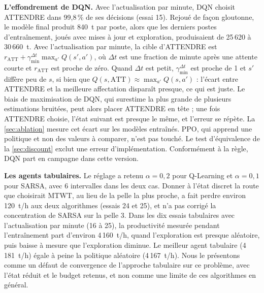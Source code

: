\documentclass[11pt,a4paper]{article}
\newif\ifrevmarks
\newcommand{\revtag}[1]{\ifrevmarks\textsuperscript{\textcolor{red!70!black}{\scriptsize[#1]}}\fi}
\newenvironment{revbloc}[1]{\par\ifrevmarks\color{revcolor}\noindent\revtag{#1}\ \fi}{\par}
\newif\ifcorrmarks
\newcommand{\corr}[1]{\ifcorrmarks\textcolor{corrcolor}{#1}\else#1\fi}
\begin{document}
\begin{revbloc}{v3}
\textbf{L'effondrement de DQN.} Avec l'actualisation par minute, DQN choisit ATTENDRE dans 99,8\,\% de ses décisions (essai 15). Rejoué de façon gloutonne, le modèle final produit 840~t par poste, alors que les derniers postes d'entraînement, joués avec mises à jour et exploration, produisaient de 25\,620 à 30\,660~t. \corr{Avec l'actualisation par minute, la cible d'ATTENDRE est $r_{\mathrm{ATT}} + \gamma_{\min}^{\Delta t}\max_{a'} Q(s',a')$, où $\Delta t$ est une fraction de minute après une attente courte et $r_{\mathrm{ATT}}$ est proche de zéro. Quand $\Delta t$ est petit, $\gamma_{\min}^{\Delta t}$ est proche de 1 et $s'$ diffère peu de $s$, si bien que $Q(s,\mathrm{ATT}) \approx \max_{a'} Q(s,a')$ : l'écart entre ATTENDRE et la meilleure affectation disparaît presque, ce qui est juste. Le biais de maximisation de DQN, qui surestime la plus grande de plusieurs estimations bruitées, peut alors placer ATTENDRE en tête ; une fois ATTENDRE choisie, l'état suivant est presque le même, et l'erreur se répète. La \cref{sec:ablation} mesure cet écart sur les modèles entraînés.} PPO, qui apprend une politique et non des valeurs à comparer, n'est pas touché. Le test d'équivalence de la \cref{sec:discount} exclut une erreur d'implémentation. Conformément à la règle, DQN part en campagne dans cette version.

\textbf{Les agents tabulaires.} Le réglage a retenu $\alpha = 0{,}2$ pour Q-Learning et $\alpha = 0{,}1$ pour SARSA, avec 6 intervalles dans les deux cas. Donner à l'état discret la route que choisirait MTWT, au lieu de la pelle la plus proche, a fait perdre environ 120~t/h aux deux algorithmes (essais 24 et 25), et n'a pas corrigé la concentration de SARSA sur la pelle 3. Dans les dix essais tabulaires avec l'actualisation par minute (16 à 25), la productivité mesurée pendant l'entraînement part d'environ 4\,160~t/h, quand l'exploration est presque aléatoire, puis baisse à mesure que l'exploration diminue. Le meilleur agent tabulaire (4\,181~t/h) égale à peine la politique aléatoire (4\,167~t/h). Nous le présentons comme un défaut de convergence de l'approche tabulaire sur ce problème, avec l'état réduit et le budget retenus, et non comme une limite de ces algorithmes en général.
\end{revbloc}

\ifrevmarks
\clearpage
\appendix
\end{document}
